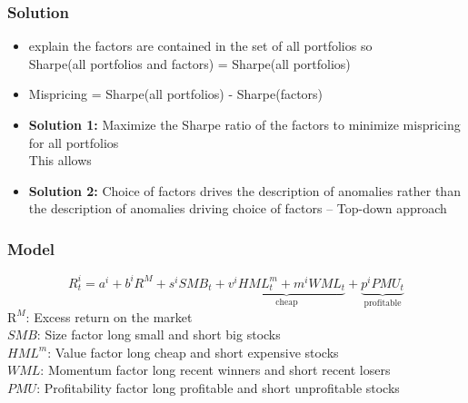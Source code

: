 \documentclass[notes]{beamer}  %
\begin{document}
\begin{frame} \frametitle{Solution}
  \begin{itemize}
    \item \textcite{barillas2016alpha} explain the factors are contained in
    the set of all portfolios so\\
    Sharpe(all portfolios and factors) = Sharpe(all portfolios)
    \item Mispricing = Sharpe(all portfolios) - Sharpe(factors)
    \item \textbf{Solution 1:} Maximize the Sharpe ratio of the factors to
    minimize mispricing for all portfolios\\
    This allows
    \item \textbf{Solution 2:} Choice of factors drives the description
    of anomalies rather than the description of anomalies driving choice
    of factors -- Top-down approach
  \end{itemize}
\end{frame}


\begin{frame} \frametitle{Model}
  \begin{equation} \label{eq:B16}
    R_t^i = a^i+b^iR^M+s^iSMB_t+
    \underbrace{v^iHML_t^m+m^iWML_t}_\text{cheap}+
    \underbrace{p^iPMU_t}_\text{profitable}
  \end{equation}
  $\text{R}^M$: Excess return on the market\\
  $SMB$: Size factor long small and short big stocks\\
  $HML^m$: Value factor long cheap and short expensive stocks\\
  $WML$: Momentum factor long recent winners and short recent losers\\
  $PMU$: Profitability factor long profitable and short unprofitable stocks
\end{frame}
\end{document}
